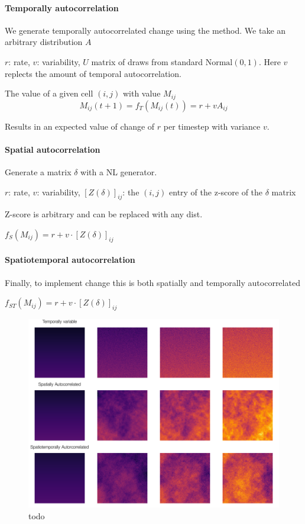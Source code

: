 \documentclass[11pt]{article}
\makeatletter
\def\maxwidth{\ifdim\Gin@nat@width>\linewidth\linewidth
\else\Gin@nat@width\fi}
\let\Oldincludegraphics\includegraphics
\renewcommand{\includegraphics}[1]{\Oldincludegraphics[width=\maxwidth]{#1}}
\makeatother
\begin{document}
\hypertarget{temporally-autocorrelation}{%
\paragraph{Temporally
autocorrelation}\label{temporally-autocorrelation}}

We generate temporally autocorrelated change using the method. We take
an arbitrary distribution \(A\)

\(r\): rate, \(v\): variability, \(U\) matrix of draws from standard
\(\text{Normal}(0,1)\). Here \(v\) replects the amount of temporal
autocorrelation.

The value of a given cell \((i,j)\) with value \(M_{ij}\)
\[M_{ij}(t+1) = f_{T}(M_{ij}(t)) = r + vA_{ij}\]

Results in an expected value of change of \(r\) per timestep with
variance \(v\).

\hypertarget{spatial-autocorrelation}{%
\paragraph{Spatial autocorrelation}\label{spatial-autocorrelation}}

Generate a matrix \(\delta\) with a NL generator.

\(r\): rate, \(v\): variability, \([Z(\delta)]_{ij}\): the \((i,j)\)
entry of the z-score of the \(\delta\) matrix

Z-score is arbitrary and can be replaced with any dist.

\(f_{S}(M_{ij}) = r + v \cdot [Z(\delta)]_{ij}\)

\hypertarget{spatiotemporal-autocorrelation}{%
\paragraph{Spatiotemporal
autocorrelation}\label{spatiotemporal-autocorrelation}}

Finally, to implement change this is both spatially and temporally
autocorrelated

\(f_{ST}(M_{ij}) = r + v \cdot [Z(\delta)]_{ij}\)

\begin{figure}
\centering
\includegraphics{./figures/temporal.png}
\caption{todo}
\end{figure}
\end{document}
